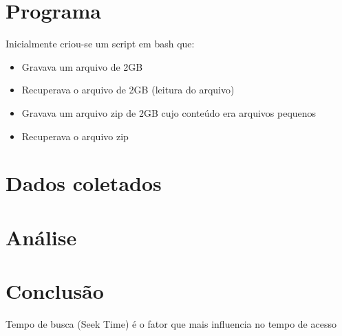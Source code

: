 \documentclass[10pt,a4paper]{article}
\begin{document}
\section{Programa}
Inicialmente criou-se um script em bash que:
\begin{itemize}
\item Gravava um arquivo de 2GB
\item Recuperava o arquivo de 2GB (leitura  do arquivo) 
\item Gravava um arquivo zip de 2GB cujo conteúdo era arquivos pequenos
\item Recuperava o arquivo zip
\end{itemize}


\section{Dados coletados}

\section{Análise}
\section{Conclusão}
Tempo de busca (Seek Time) é o fator que mais influencia no tempo de acesso 

%
%  
\end{document}
